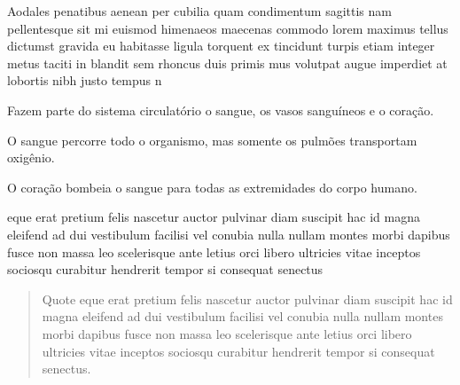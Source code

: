 Aodales penatibus aenean per
 cubilia quam condimentum sagittis nam pellentesque sit mi euismod himenaeos
 maecenas commodo lorem maximus tellus dictumst gravida eu habitasse ligula
 torquent ex tincidunt turpis etiam integer metus taciti in blandit sem
 rhoncus duis primis mus volutpat augue imperdiet at lobortis nibh justo
 tempus n

\begin{boxlist}
 Fazem parte do sistema circulatório o sangue, os vasos sanguíneos e o coração.

 O sangue percorre todo o organismo, mas somente os pulmões transportam oxigênio.

 O coração bombeia o sangue para todas as extremidades do corpo humano.
\end{boxlist}

 eque erat pretium felis nascetur auctor pulvinar diam suscipit hac
 id magna eleifend ad dui vestibulum facilisi vel conubia nulla nullam montes
 morbi dapibus fusce non massa leo scelerisque ante letius orci libero
 ultricies vitae inceptos sociosqu curabitur hendrerit tempor si consequat
 senectus


\lipsum[1]




\begin{quotation}
 Quote eque erat pretium felis nascetur auctor pulvinar diam suscipit hac
 id magna eleifend ad dui vestibulum facilisi vel conubia nulla nullam montes
 morbi dapibus fusce non massa leo scelerisque ante letius orci libero
 ultricies vitae inceptos sociosqu curabitur hendrerit tempor si consequat
 senectus.

\end{quotation}